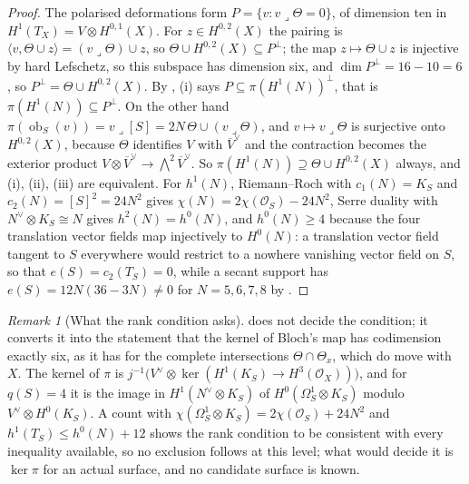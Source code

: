 \documentclass[11pt,reqno]{amsart}
\theoremstyle{plain}
\theoremstyle{definition}
\theoremstyle{remark}
\newtheorem{remark}[theorem]{Remark}
\newcommand{\cO}{\mathcal{O}}
\begin{document}
\begin{proof}
The polarised deformations form $P=\{v:v\lrcorner\Theta=0\}$, of dimension
ten in $H^{1}(T_{X})=V\otimes H^{0,1}(X)$. For $z\in H^{0,2}(X)$ the pairing
is $\langle v,\Theta\cup z\rangle=(v\lrcorner\Theta)\cup z$, so
$\Theta\cup H^{0,2}(X)\subseteq P^{\perp}$; the map $z\mapsto\Theta\cup z$ is
injective by hard Lefschetz, so this subspace has dimension six, and
$\dim P^{\perp}=16-10=6$, so $P^{\perp}=\Theta\cup H^{0,2}(X)$. By
, (i) says $P\subseteq\pi(H^{1}(N))^{\perp}$, that is
$\pi(H^{1}(N))\subseteq P^{\perp}$. On the other hand
$\pi(\operatorname{ob}_{S}(v))=v\lrcorner[S]=2N\,\Theta\cup(v\lrcorner\Theta)$,
and $v\mapsto v\lrcorner\Theta$ is surjective onto $H^{0,2}(X)$, because
$\Theta$ identifies $V$ with $\overline{V}^{\vee}$ and the contraction becomes
the exterior product $V\otimes\overline{V}^{\vee}\to\bigwedge^{2}\overline{V}^{\vee}$.
So $\pi(H^{1}(N))\supseteq\Theta\cup H^{0,2}(X)$ always, and (i), (ii), (iii)
are equivalent. For $h^{1}(N)$, Riemann--Roch with $c_{1}(N)=K_{S}$ and
$c_{2}(N)=[S]^{2}=24N^{2}$ gives $\chi(N)=2\chi(\cO_{S})-24N^{2}$, Serre
duality with $N^{\vee}\otimes K_{S}\cong N$ gives $h^{2}(N)=h^{0}(N)$, and
$h^{0}(N)\ge4$ because the four translation vector fields map injectively to
$H^{0}(N)$: a translation vector field tangent to $S$ everywhere would restrict
to a nowhere vanishing vector field on $S$, so that $e(S)=c_{2}(T_{S})=0$,
while a secant support has $e(S)=12N(36-3N)\ne0$ for $N=5,6,7,8$ by
.
\end{proof}

\begin{remark}[What the rank condition asks]\label{rem:smoothrank}
 does not decide the condition; it converts it into the
statement that the kernel of Bloch's map has codimension exactly six, as it
has for the complete intersections $\Theta\cap\Theta_{x}$, which do move with
$X$. The kernel of $\pi$ is
$j^{-1}\bigl(V^{\vee}\otimes\ker(H^{1}(K_{S})\to H^{3}(\cO_{X}))\bigr)$, and
for $q(S)=4$ it is the image in $H^{1}(N^{\vee}\otimes K_{S})$ of
$H^{0}(\Omega^{1}_{S}\otimes K_{S})$ modulo $V^{\vee}\otimes H^{0}(K_{S})$. A
count with $\chi(\Omega^{1}_{S}\otimes K_{S})=2\chi(\cO_{S})+24N^{2}$ and
$h^{1}(T_{S})\le h^{0}(N)+12$ shows the rank condition to be consistent with
every inequality available, so no exclusion follows at this level; what
would decide it is $\ker\pi$ for an actual surface, and no candidate surface
is known.
\end{remark}
\end{document}
